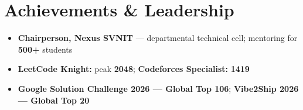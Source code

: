 \documentclass[a4paper,10pt]{article}
\begin{document}
\section{Achievements \& Leadership}
\begin{itemize}
  \item \textbf{Chairperson, Nexus SVNIT} --- departmental technical cell; mentoring for \textbf{500+} students
  \item \textbf{LeetCode Knight:} peak \textbf{2048}; \textbf{Codeforces Specialist:} \textbf{1419}
  \item \textbf{Google Solution Challenge 2026 --- Global Top 106}; \textbf{Vibe2Ship 2026 --- Global Top 20}
\end{itemize}
\end{document}
